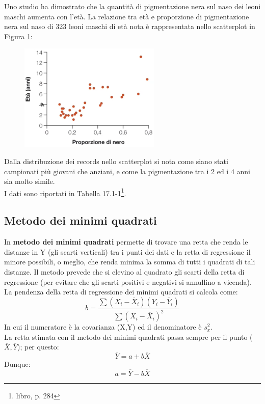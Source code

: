 \documentclass[10pt, draft]{book}
\newcounter{example}[section]
\begin{document}
\begin{example}\label{esleoni}
    Uno studio ha dimostrato che la quantità di pigmentazione nera sul naso dei leoni maschi aumenta con l'età. La relazione tra età e proporzione di pigmentazione nera sul naso di 323 leoni maschi di età nota è rappresentata nello scatterplot in Figura \ref{fig17.1-1}:\\
    \begin{figure}[H]
        \centering
        \includegraphics[width=0.6\textwidth]{fig17.1-1}
        \caption{\small{}}
        \label{fig17.1-1}
    \end{figure}

    Dalla distribuzione dei records nello scatterplot si nota come siano stati campionati più giovani che anziani, e come la pigmentazione tra i 2 ed i 4 anni sia molto simile.\\
    I dati sono riportati in Tabella 17.1-1\footnote{libro, p. 284}.
\end{example}

\subsection{Metodo dei minimi quadrati}

In \textbf{metodo dei minimi quadrati} permette di trovare una retta che renda le distanze in Y (gli scarti verticali) tra i punti dei dati e la retta di regressione il minore possibili, o meglio, che renda minima la somma di tutti i quadrati di tali distanze. Il metodo prevede che si elevino al quadrato gli scarti della retta di regressione (per evitare che gli scarti positivi e negativi si annullino a vicenda).\\

La pendenza della retta di regressione dei minimi quadrati si calcola come:
\begin{equation}
    b = \frac{\sum{(X_i-\overline{X}_i)(Y_i-\overline{Y}_i)}}{\sum{(X_i-\overline{X}_i)^2}}
\end{equation}
In cui il numeratore è la covarianza (X,Y) ed il denominatore è $s_x^2$.\\
La retta stimata con il metodo dei minimi quadrati passa sempre per il punto ($\overline{X},\overline{Y}$); per questo:
\begin{equation}
    \overline{Y} = a+b\overline{X}
\end{equation}
Dunque:
\begin{equation}
    a = \overline{Y}-b\overline{X}
\end{equation}
\end{document}
